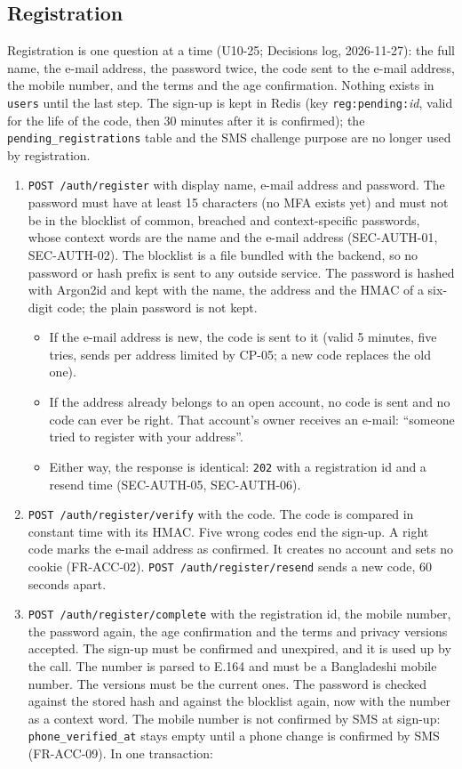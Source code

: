 \documentclass[11pt,a4paper]{article}
\begin{document}
\subsection{Registration}
\label{sec:flow-register}
Registration is one question at a time (U10-25; Decisions log, 2026-11-27): the full name, the e-mail address, the password twice, the code sent to the e-mail address, the mobile number, and the terms and the age confirmation. Nothing exists in \texttt{users} until the last step. The sign-up is kept in Redis (key \texttt{reg:pending:}\textit{id}, valid for the life of the code, then 30 minutes after it is confirmed); the \texttt{pending\_registrations} table and the SMS challenge purpose are no longer used by registration.
\begin{enumerate}[nosep]
  \item \texttt{POST /auth/register} with display name, e-mail address and password. The password must have at least 15 characters (no MFA exists yet) and must not be in the blocklist of common, breached and context-specific passwords, whose context words are the name and the e-mail address (SEC-AUTH-01, SEC-AUTH-02). The blocklist is a file bundled with the backend, so no password or hash prefix is sent to any outside service. The password is hashed with Argon2id and kept with the name, the address and the HMAC of a six-digit code; the plain password is not kept.
  \begin{itemize}[nosep]
    \item If the e-mail address is new, the code is sent to it (valid 5 minutes, five tries, sends per address limited by CP-05; a new code replaces the old one).
    \item If the address already belongs to an open account, no code is sent and no code can ever be right. That account's owner receives an e-mail: ``someone tried to register with your address''.
    \item Either way, the response is identical: \texttt{202} with a registration id and a resend time (SEC-AUTH-05, SEC-AUTH-06).
  \end{itemize}
  \item \texttt{POST /auth/register/verify} with the code. The code is compared in constant time with its HMAC. Five wrong codes end the sign-up. A right code marks the e-mail address as confirmed. It creates no account and sets no cookie (FR-ACC-02). \texttt{POST /auth/register/resend} sends a new code, 60 seconds apart.
  \item \texttt{POST /auth/register/complete} with the registration id, the mobile number, the password again, the age confirmation and the terms and privacy versions accepted. The sign-up must be confirmed and unexpired, and it is used up by the call. The number is parsed to E.164 and must be a Bangladeshi mobile number. The versions must be the current ones. The password is checked against the stored hash and against the blocklist again, now with the number as a context word. The mobile number is not confirmed by SMS at sign-up: \texttt{phone\_verified\_at} stays empty until a phone change is confirmed by SMS (FR-ACC-09). In one transaction:

\end{enumerate}
\end{document}
